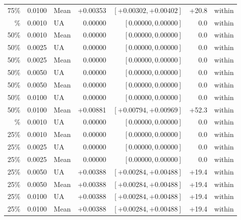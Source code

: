\begin{table}[H]
\begin{tabular}{@{}rrlrrrl@{}}
75\% & 0.0100 & Mean & +0.00353 & $[+0.00302, +0.00402]$ & +20.8 & within \\
\addlinespace
50\% & 0.0010 & UA & 0.00000 & $[0.00000, 0.00000]$ & 0.0 & within \\
50\% & 0.0010 & Mean & 0.00000 & $[0.00000, 0.00000]$ & 0.0 & within \\
50\% & 0.0025 & UA & 0.00000 & $[0.00000, 0.00000]$ & 0.0 & within \\
50\% & 0.0025 & Mean & 0.00000 & $[0.00000, 0.00000]$ & 0.0 & within \\
50\% & 0.0050 & UA & 0.00000 & $[0.00000, 0.00000]$ & 0.0 & within \\
50\% & 0.0050 & Mean & 0.00000 & $[0.00000, 0.00000]$ & 0.0 & within \\
50\% & 0.0100 & UA & 0.00000 & $[0.00000, 0.00000]$ & 0.0 & within \\
50\% & 0.0100 & Mean & +0.00881 & $[+0.00794, +0.00969]$ & +52.3 & within \\
\addlinespace
25\% & 0.0010 & UA & 0.00000 & $[0.00000, 0.00000]$ & 0.0 & within \\
25\% & 0.0010 & Mean & 0.00000 & $[0.00000, 0.00000]$ & 0.0 & within \\
25\% & 0.0025 & UA & 0.00000 & $[0.00000, 0.00000]$ & 0.0 & within \\
25\% & 0.0025 & Mean & 0.00000 & $[0.00000, 0.00000]$ & 0.0 & within \\
25\% & 0.0050 & UA & +0.00388 & $[+0.00284, +0.00488]$ & +19.4 & within \\
25\% & 0.0050 & Mean & +0.00388 & $[+0.00284, +0.00488]$ & +19.4 & within \\
25\% & 0.0100 & UA & +0.00388 & $[+0.00284, +0.00488]$ & +19.4 & within \\
25\% & 0.0100 & Mean & +0.00388 & $[+0.00284, +0.00488]$ & +19.4 & within \\
\bottomrule
\end{tabular}
\end{table}
